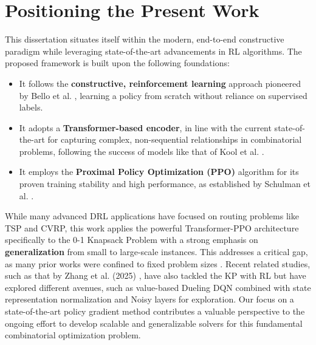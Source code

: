 \section{Positioning the Present Work}
This dissertation situates itself within the modern, end-to-end constructive paradigm while leveraging state-of-the-art advancements in RL algorithms. The proposed framework is built upon the following foundations:
\begin{itemize}
    \item It follows the \textbf{constructive, reinforcement learning} approach pioneered by Bello et al. \cite{belloNeuralCombinatorialOptimization2017}, learning a policy from scratch without reliance on supervised labels.
    \item It adopts a \textbf{Transformer-based encoder}, in line with the current state-of-the-art for capturing complex, non-sequential relationships in combinatorial problems, following the success of models like that of Kool et al. \cite{koolAttentionLearnSolve2019a}.
    \item It employs the \textbf{Proximal Policy Optimization (PPO)} algorithm for its proven training stability and high performance, as established by Schulman et al. \cite{schulmanProximalPolicyOptimization2017}.
\end{itemize}

While many advanced DRL applications have focused on routing problems like TSP and CVRP, this work applies the powerful Transformer-PPO architecture specifically to the 0-1 Knapsack Problem with a strong emphasis on \textbf{generalization} from small to large-scale instances. This addresses a critical gap, as many prior works were confined to fixed problem sizes \cite{belloNeuralCombinatorialOptimization2017}. Recent related studies, such as that by Zhang et al. (2025) \cite{zhangReinforcementLearningSolving2025}, have also tackled the KP with RL but have explored different avenues, such as value-based Dueling DQN combined with state representation normalization and Noisy layers for exploration. Our focus on a state-of-the-art policy gradient method contributes a valuable perspective to the ongoing effort to develop scalable and generalizable solvers for this fundamental combinatorial optimization problem.

